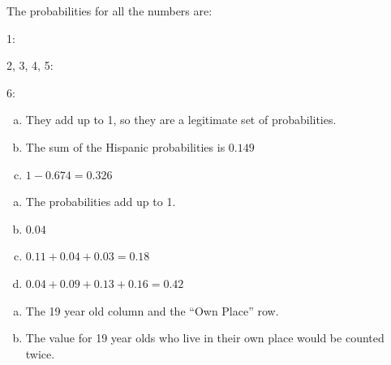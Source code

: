 \documentclass[letterpaper]{exam}
\begin{document}
\begin{description}
        The probabilities for all the numbers are:
        \begin{itemize*}
          \item 1: 
          \item 2, 3, 4, 5: 
          \item 6: 
        \end{itemize*}


      \item[40]
        \begin{enumerate}[(a)]
          \item They add up to 1, so they are a legitimate set of probabilities.

          \item The sum of the Hispanic probabilities is $\boxed{ 0.149 }$

          \item $1 - 0.674 = \boxed{ 0.326 }$
        \end{enumerate}

      \item[41]
        \begin{enumerate}[(a)]
          \item The probabilities add up to 1.

          \item $\boxed{ 0.04 }$

          \item $0.11 + 0.04 + 0.03 = \boxed{ 0.18 }$

          \item $0.04 + 0.09 + 0.13 + 0.16 = \boxed{ 0.42 }$

        \end{enumerate}

      \item[42]
        \begin{enumerate}[(a)]
          \item The 19 year old column and the ``Own Place'' row.

          \item The value for 19 year olds who live in their own place would be
            counted twice.


\end{enumerate}
\end{description}
\end{document}
